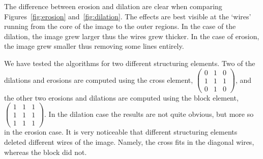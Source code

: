 The difference between erosion and dilation are clear when comparing Figures~\ref{fig:erosion} and~\ref{fig:dilation}.
The effects are best visible at the `wires' running from the core of the image to the outer regions.
In the case of the dilation, the image grew larger thus the wires grew thicker.
In the case of erosion, the image grew smaller thus removing some lines entirely.

We have tested the algorithms for two different structuring elements.
Two of the dilations and erosions are computed using the cross element, \(\left(\begin{matrix}0 & 1 & 0 \\ 1 & 1 & 1 \\ 0 & 1 & 0 \end{matrix}\right)\), and the other two erosions and dilations are computed using the block element, \(\left(\begin{matrix}1 & 1 & 1 \\ 1 & 1 & 1 \\ 1& 1 & 1 \end{matrix}\right)\).
In the dilation case the results are not quite obvious, but more so in the erosion case.
It is very noticeable that different structuring elements deleted different wires of the image. 
Namely, the cross fits in the diagonal wires, whereas the block did not.

\clearpage